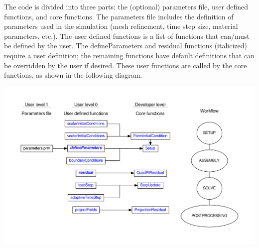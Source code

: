 The code is divided into three parts\-: the (optional) parameters file, user defined functions, and core functions. The parameters file includes the definition of parameters used in the simulation (mesh refinement, time step size, material parameters, etc.). The user defined functions is a list of functions that can/must be defined by the user. The {\ttfamily define\-Parameters} and {\ttfamily residual} functions (italicized) require a user definition; the remaining functions have default definitions that can be overridden by the user if desired. These user functions are called by the core functions, as shown in the following diagram.

\begin{center}

\begin{DoxyImageNoCaption}
  \mbox{\includegraphics[width=\textwidth,height=\textheight/2,keepaspectratio=true]{dot_inline_dotgraph_1}}
\end{DoxyImageNoCaption}
\end{center}
 
